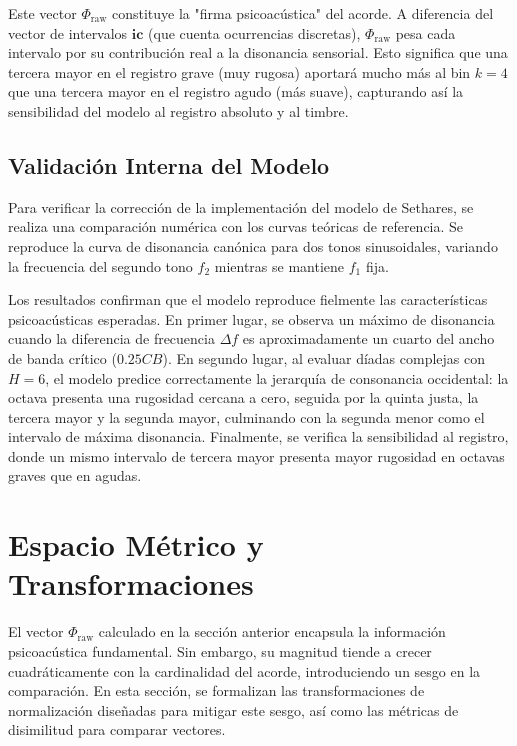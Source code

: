 Este vector $\Phi_{\text{raw}}$ constituye la "firma psicoacústica" del acorde. A diferencia del vector de intervalos $\mathbf{ic}$ (que cuenta ocurrencias discretas), $\Phi_{\text{raw}}$ pesa cada intervalo por su contribución real a la disonancia sensorial. Esto significa que una tercera mayor en el registro grave (muy rugosa) aportará mucho más al bin $k=4$ que una tercera mayor en el registro agudo (más suave), capturando así la sensibilidad del modelo al registro absoluto y al timbre.

\subsection{Validación Interna del Modelo}

Para verificar la corrección de la implementación del modelo de Sethares, se realiza una comparación numérica con los curvas teóricas de referencia. Se reproduce la curva de disonancia canónica para dos tonos sinusoidales, variando la frecuencia del segundo tono $f_2$ mientras se mantiene $f_1$ fija.

Los resultados confirman que el modelo reproduce fielmente las características psicoacústicas esperadas. En primer lugar, se observa un máximo de disonancia cuando la diferencia de frecuencia $\Delta f$ es aproximadamente un cuarto del ancho de banda crítico ($0.25 CB$). En segundo lugar, al evaluar díadas complejas con $H=6$, el modelo predice correctamente la jerarquía de consonancia occidental: la octava presenta una rugosidad cercana a cero, seguida por la quinta justa, la tercera mayor y la segunda mayor, culminando con la segunda menor como el intervalo de máxima disonancia. Finalmente, se verifica la sensibilidad al registro, donde un mismo intervalo de tercera mayor presenta mayor rugosidad en octavas graves que en agudas.

\section{Espacio Métrico y Transformaciones}
\label{sec:transformaciones}

El vector $\Phi_{\text{raw}}$ calculado en la sección anterior encapsula la información psicoacústica fundamental. Sin embargo, su magnitud tiende a crecer cuadráticamente con la cardinalidad del acorde, introduciendo un sesgo en la comparación. En esta sección, se formalizan las transformaciones de normalización diseñadas para mitigar este sesgo, así como las métricas de disimilitud para comparar vectores.

